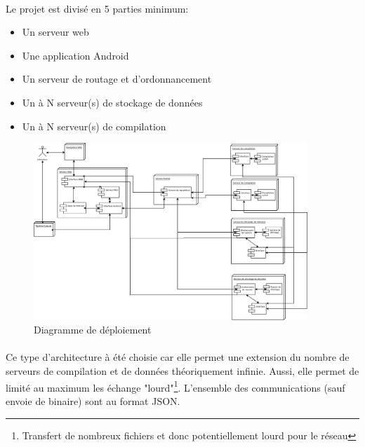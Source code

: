 \documentclass[a4paper,12pt]{article}
\begin{document}
\paragraph*{}
Le projet est divisé en 5 parties minimum:
\begin{itemize}
 \item Un serveur web
 \item Une application Android
 \item Un serveur de routage et d'ordonnancement
 \item Un à N serveur(s) de stockage de données
 \item Un à N serveur(s) de compilation
\end{itemize}

\begin{figure}[!ht]
\begin{center}
  \includegraphics[width=0.92\textwidth,angle=90]{./images/DiagrammeDeploiement.jpg}
\end{center}
  \caption{Diagramme de déploiement}
  \label{déploiement}
\end{figure}

\paragraph*{}
Ce type d'architecture à été choisie car elle permet une extension du nombre de serveurs de compilation et de données théoriquement infinie. Aussi, elle permet de limité au maximum les échange "lourd"\footnote{Transfert de nombreux fichiers et donc potentiellement lourd pour le réseau}. L'ensemble des communications (sauf envoie de binaire) sont au format JSON.
\end{document}
